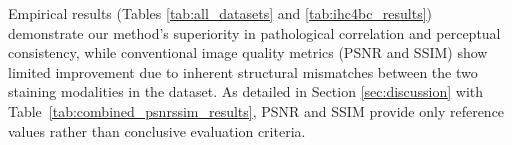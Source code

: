 \documentclass[journal,twoside,web]{ieeecolor}
\begin{document}
Empirical results (Tables \ref{tab:all_datasets} and \ref{tab:ihc4bc_results}) demonstrate our method's superiority in pathological correlation and perceptual consistency, 
while conventional image quality metrics (PSNR and SSIM) show limited improvement due to inherent structural mismatches between the two staining modalities in the dataset\cite{liu2022bci}.
As detailed in Section \ref{sec:discussion} with Table~\ref{tab:combined_psnrssim_results}, PSNR and SSIM provide only reference values rather than conclusive evaluation criteria.

\end{document}
